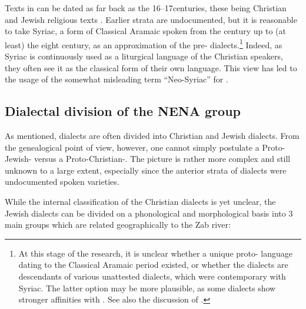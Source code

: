	Texts in  can be dated as far back as the 16\th--17\th centuries, these being Christian and Jewish religious texts \parencites[Jewish:][]{SabarNerwa, SabarMidrashim}[Christian:][]{MengozziPoetry2002, MengozziPoetry2011}. Earlier strata are undocumented, but it is reasonable to take Syriac, a form of Classical Aramaic spoken from the \first century up to (at least) the eight century, as an approximation of the pre- dialects.\footnote{At this stage of the research, it is unclear whether a unique proto- language dating to the Classical Aramaic period existed, or whether the  dialects are descendants of various unattested dialects, which were contemporary with Syriac. The latter option may be more plausible, as some  dialects show stronger affinities with \JBA. See also the discussion of \citet{KimStammbaum}.}
	 Indeed, as Syriac is continuously used as a liturgical language of the Christian  speakers, they often see it as the classical form of their own language. This view has led to the usage of the somewhat misleading term \enquote{Neo-Syriac} for .  
	
\subsection{Dialectal division of the NENA group} \label{ss:intro_dialects}
		
		
As mentioned,  dialects are often divided into Christian and Jewish dialects.  From the genealogical point of view, however, one cannot simply postulate  a Proto-Jewish- versus a Proto-Christian-. The picture is rather more complex and still unknown to a large extent, especially since the anterior strata of  dialects were  undocumented spoken varieties. 
		
While the internal classification of the Christian dialects is yet unclear, the Jewish dialects can be divided on a phonological and morphological basis into 3 main groups \citep{MutzafiTransZab} which are related geographically to the Zab river:

